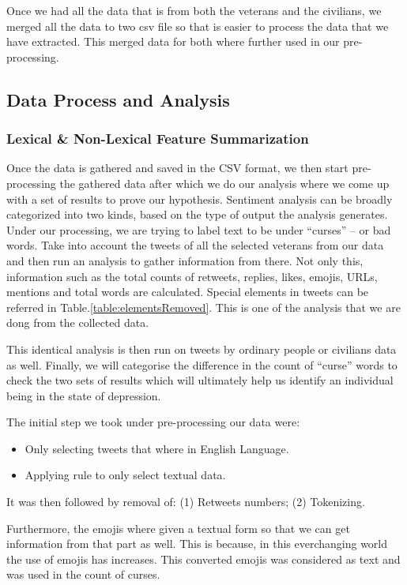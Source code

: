 Once we had all the data that is from both the veterans and the civilians, we merged all the data to two csv file so that is easier to process the data that we have extracted. This merged data for both where further used in our pre-processing.

\subsection{Data Process and Analysis}

\subsubsection{Lexical \& Non-Lexical Feature Summarization}

Once the data is gathered and saved in the CSV format, we then start pre-processing the gathered data after which we do our analysis where we come up with a set of results to prove our hypothesis. Sentiment analysis can be broadly categorized into two kinds, based on the type of output the analysis generates. Under our processing, we are trying to label text to be under \enquote{curses} – or bad words. Take into account the tweets of all the selected veterans from our data and then run an analysis to gather information from there. Not only this, information such as the total counts of retweets, replies, likes, emojis, URLs, mentions and total words are calculated. Special elements in tweets can be referred in Table.\ref{table:elementsRemoved}. This is one of the analysis that we are dong from the collected data.

This identical analysis is then run on tweets by ordinary people or civilians data as well. Finally, we will categorise the difference in the count of \enquote{curse} words to check the two sets of results which will ultimately help us identify an individual being in the state of depression.

The initial step we took under pre-processing our data were:

\begin{itemize}
  \item Only selecting tweets that where in English Language.
  \item Applying rule to only select textual data.
\end{itemize}

It was then followed by removal of: (1) Retweets numbers; (2) Tokenizing.

Furthermore, the emojis where given a textual form so that we can get information from that part as well. This is because, in this everchanging world the use of emojis has increases. This converted emojis was considered as text and was used in the count of curses.

